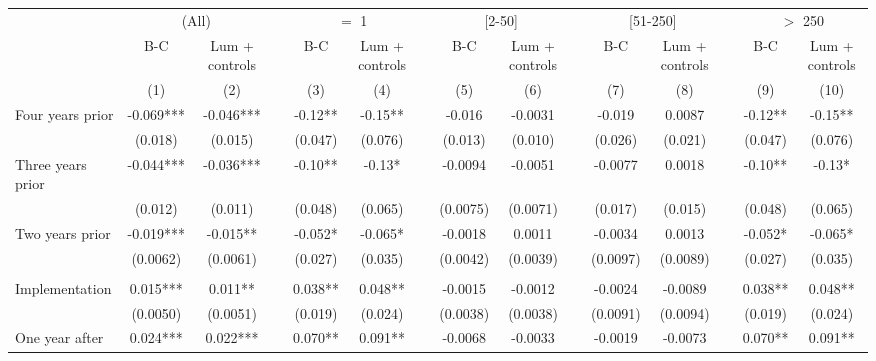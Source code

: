 \begin{tabular}{lcccccccccccccc}
\toprule
      & \multicolumn{2}{c}{(All)} &       & \multicolumn{2}{c}{$=$ 1} &       & \multicolumn{2}{c}{[2-50]} &       & \multicolumn{2}{c}{[51-250]} &       & \multicolumn{2}{c}{$>$ 250} \\
\cmidrule{2-3}\cmidrule{5-6}\cmidrule{8-9}\cmidrule{11-12}\cmidrule{14-15}      & B-C   & Lum + controls &       & B-C   & Lum + controls &       & B-C   & Lum + controls &       & B-C   & Lum + controls &       & B-C   & Lum + controls \\
\midrule
      & (1)   & (2)   &       & (3)   & (4)   &       & (5)   & (6)   &       & (7)   & (8)   &       & (9)   & (10) \\
\midrule
\midrule
Four years prior & -0.069*** & -0.046*** &       & -0.12** & -0.15** &       & -0.016 & -0.0031 &       & -0.019 & 0.0087 &       & -0.12** & -0.15** \\
      & (0.018) & (0.015) &       & (0.047) & (0.076) &       & (0.013) & (0.010) &       & (0.026) & (0.021) &       & (0.047) & (0.076) \\
Three years prior & -0.044*** & -0.036*** &       & -0.10** & -0.13* &       & -0.0094 & -0.0051 &       & -0.0077 & 0.0018 &       & -0.10** & -0.13* \\
      & (0.012) & (0.011) &       & (0.048) & (0.065) &       & (0.0075) & (0.0071) &       & (0.017) & (0.015) &       & (0.048) & (0.065) \\
Two years prior & -0.019*** & -0.015** &       & -0.052* & -0.065* &       & -0.0018 & 0.0011 &       & -0.0034 & 0.0013 &       & -0.052* & -0.065* \\
      & (0.0062) & (0.0061) &       & (0.027) & (0.035) &       & (0.0042) & (0.0039) &       & (0.0097) & (0.0089) &       & (0.027) & (0.035) \\
      &       &       &       &       &       &       &       &       &       &       &       &       &       &  \\
Implementation & 0.015*** & 0.011** &       & 0.038** & 0.048** &       & -0.0015 & -0.0012 &       & -0.0024 & -0.0089 &       & 0.038** & 0.048** \\
      & (0.0050) & (0.0051) &       & (0.019) & (0.024) &       & (0.0038) & (0.0038) &       & (0.0091) & (0.0094) &       & (0.019) & (0.024) \\
One year after & 0.024*** & 0.022*** &       & 0.070** & 0.091** &       & -0.0068 & -0.0033 &       & -0.0019 & -0.0073 &       & 0.070** & 0.091** \\

\end{tabular}
